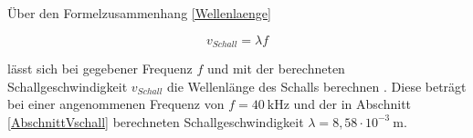 Über den Formelzusammenhang \ref{Wellenlaenge}

\begin{equation}
    v_{Schall}=\lambda f
    \label{Wellenlaenge}
\end{equation}

lässt sich bei gegebener Frequenz $f$ und mit der berechneten Schallgeschwindigkeit $v_{Schall}$ die Wellenlänge des Schalls berechnen \cite{Willems:2022}. Diese beträgt bei einer angenommenen Frequenz von $f=40 \:\text{kHz}$ und der in Abschnitt \ref{AbschnittVschall} berechneten Schallgeschwindigkeit $\lambda=8{,}58 \cdot 10^{-3} \:\text{m}$.







        
